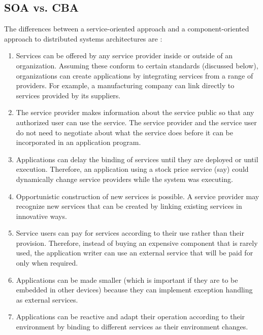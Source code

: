 \documentclass[12pt,a4paper,final,twoside,onecolumn,titlepage]{book}
\begin{document}
\subsection{SOA vs. CBA}
The differences between a service-oriented approach and a component-oriented approach to distributed systems architectures are \cite{SOAvsCBA-1}:
\begin{enumerate}
\item Services can be offered by any service provider inside or outside of an organization. Assuming these conform to certain standards (discussed below), organizations can create applications by integrating services from a range of providers. For example, a manufacturing company can link directly to services provided by its suppliers.
\item The service provider makes information about the service public so that any authorized user can use the service. The service provider and the service user do not need to negotiate about what the service does before it can be incorporated in an application program.
\item Applications can delay the binding of services until they are deployed or until execution. Therefore, an application using a stock price service (say) could dynamically change service providers while the system was executing.
\item Opportunistic construction of new services is possible. A service provider may recognize new services that can be created by linking existing services in innovative ways.
\item Service users can pay for services according to their use rather than their provision. Therefore, instead of buying an expensive component that is rarely used, the application writer can use an external service that will be paid for only when required.
\item Applications can be made smaller (which is important if they are to be embedded in other devices) because they can implement exception handling as external services.
\item Applications can be reactive and adapt their operation according to their environment by binding to different services as their environment changes.
\end{enumerate}
\end{document}
